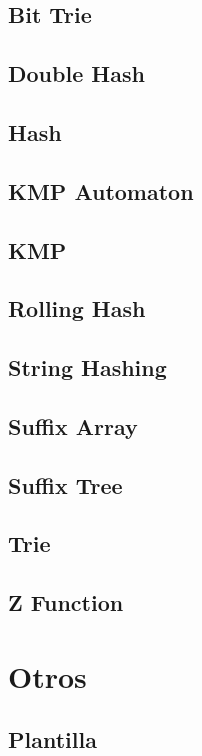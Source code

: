\documentclass[a4paper,10pt]{article}
\begin{document}
\subsection{Bit Trie}

\subsection{Double Hash}

\subsection{Hash}

\subsection{KMP Automaton}

\subsection{KMP}

\subsection{Rolling Hash}

\subsection{String Hashing}

\subsection{Suffix Array}

\subsection{Suffix Tree}

\subsection{Trie}

\subsection{Z Function}

\section{Otros}
\subsection{Plantilla}

\end{document}
